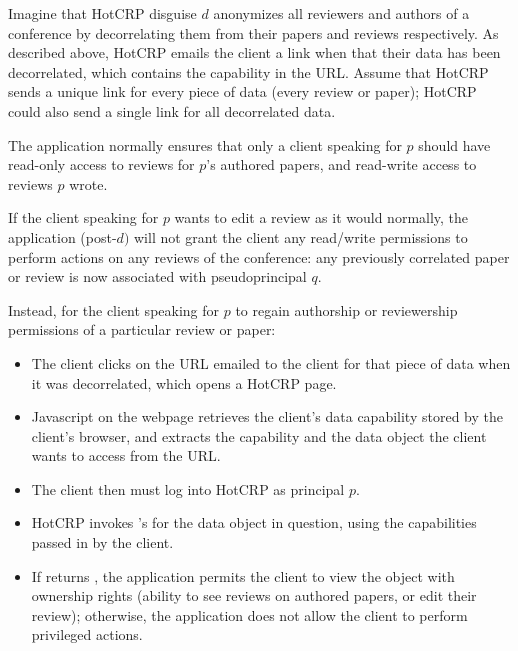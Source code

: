 
Imagine that HotCRP disguise $d$ anonymizes all reviewers and authors of a conference by
decorrelating them from their papers and reviews respectively. As described above, HotCRP emails the
client a link when that their data has been decorrelated, which contains the 
capability in the URL. Assume that HotCRP sends a unique link for every piece of data (\eg every review
or paper); HotCRP could also send a single link for all decorrelated data.

The application normally ensures that only a client speaking for $p$ should have read-only access to
reviews for $p$'s authored papers, and read-write access to reviews $p$ wrote.

If the client speaking for $p$ wants to edit a review as it would normally, the application
(post-$d)$ will not grant the client any read/write permissions to perform actions on any reviews of
the conference: any previously correlated paper or review is now associated with pseudoprincipal
$q$.  

Instead, for the client speaking for $p$ to regain authorship or reviewership permissions of a
particular review or paper:
\begin{itemize}
    \item The client clicks on the URL emailed to the client for that piece of data when it was decorrelated, which
        opens a HotCRP page.
    \item Javascript on the webpage retrieves the client's data capability
        stored by the client's browser, and extracts the  capability and the data object the client
        wants to access from the URL.
    \item The client then must log into HotCRP as principal $p$.
    \item HotCRP invokes \sys's  for the data object in question,
        using the capabilities passed in by the client.
    \item If \sys returns , the application permits the client to view the object with ownership
        rights (\eg ability to see reviews on authored papers, or edit their review); otherwise, the
        application does not allow the client to perform privileged actions.
\end{itemize}


